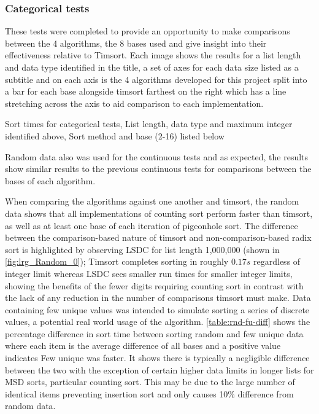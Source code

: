 \documentclass[12pt]{article}
\begin{document}
	\subsubsection{Categorical tests}
	\label{sssec:cattests}
	These tests were completed to provide an opportunity to make comparisons between the 4 algorithms, the 8 bases used and give insight into their effectiveness relative to Timsort. Each image shows the results for a list length and data type identified in the title, a set of axes for each data size listed as a subtitle and on each axis is the 4 algorithms developed for this project split into a bar for each base alongside timsort farthest on the right which has a line stretching across the axis to aid comparison to each implementation.
	\begin{table}[b]
		\centering
		\captionsetup{type=figure}
			\vspace{-0.5cm}
			\caption{Sort times for categorical tests, List length, data type and maximum integer identified above, Sort method and base (2-16) listed below\label{fig:lrg_Random_0}}
			

			
	\end{table}
	Random data also was used for the continuous tests and as expected, the results show similar results to the previous continuous tests for comparisons between the bases of each algorithm. 
	\par
	When comparing the algorithms against one another and timsort, the random data shows that all implementations of counting sort perform faster than timsort, as well as at least one base of each iteration of pigeonhole sort. The difference between the comparison-based nature of timsort and non-comparison-based radix sort is highlighted by observing LSD\textunderscore C for list length 1,000,000 (shown in \autoref{fig:lrg_Random_0}); Timsort completes sorting in roughly $0.17s$ regardless of integer limit whereas LSD\textunderscore C sees smaller run times for smaller integer limits, showing the benefits of the fewer digits requiring counting sort in contrast with the lack of any reduction in the number of comparisons timsort must make.
	Data containing few unique values was intended to simulate sorting a series of discrete values, a potential real world usage of the algorithm. \autoref{table:rnd-fu-diff} shows the percentage difference in sort time between sorting random and few unique data where each item is the average difference of all bases and a positive value indicates Few unique was faster. It shows there is typically a negligible difference between the two with the exception of certain higher data limits in longer lists for MSD sorts, particular counting sort. This may be due to the large number of identical items preventing insertion sort and only causes 10\% difference from random data.
\end{document}
